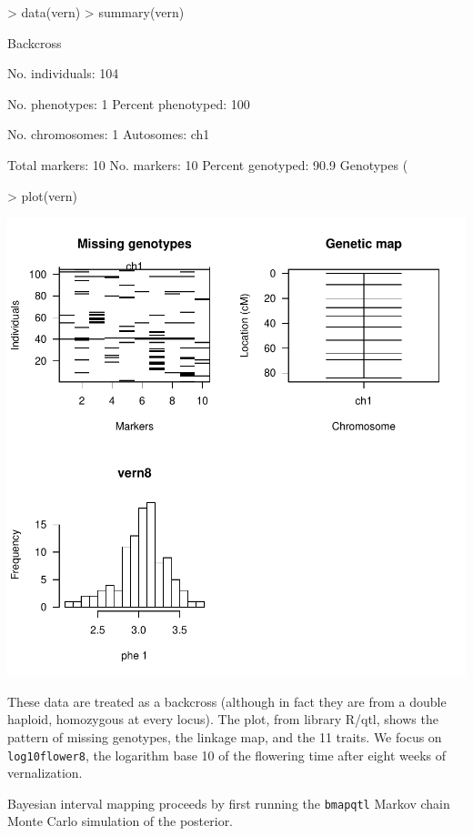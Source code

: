 \documentclass{article}
\begin{document}
\begin{Schunk}
\begin{Sinput}
> data(vern)
> summary(vern)
\end{Sinput}
\begin{Soutput}
    Backcross

    No. individuals:    104 

    No. phenotypes:     1 
    Percent phenotyped: 100 

    No. chromosomes:    1 
        Autosomes:      ch1 

    Total markers:      10 
    No. markers:        10 
    Percent genotyped:  90.9 
    Genotypes (%
\end{Soutput}
\begin{Sinput}
> plot(vern)
\end{Sinput}
\end{Schunk}
\includegraphics{bim-003}

These data are treated as a backcross (although in fact they are from
a double haploid, homozygous at every locus). The plot, from library
R/qtl, shows the pattern of missing genotypes, the linkage map, and
the 11 traits. We focus on \texttt{log10flower8}, the logarithm base
10 of the flowering time after eight weeks of vernalization.

Bayesian interval mapping proceeds by first running the
\texttt{bmapqtl} Markov chain Monte Carlo simulation of the posterior.
\end{document}
